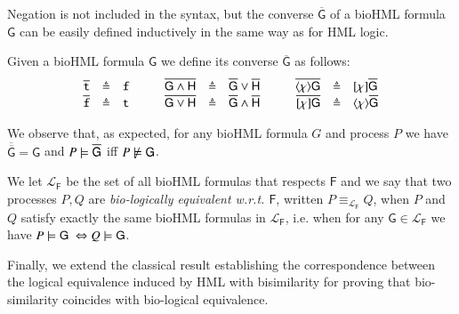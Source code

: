 Negation is not included in the syntax, but the converse $\overline{\mathsf{G}}$ of a bioHML formula $\mathsf{G}$ can be easily defined inductively in the same way as for HML logic.

\begin{definition}[Converse]
Given a bioHML formula $\mathsf{G}$ we define its converse $\overline{\mathsf{G}}$ as follows:
\[
\begin{array}{rcl@{\hspace{1cm}}rcl@{\hspace{1cm}}rcl}
\overline{\tt t} & \defeq & {\tt f} &
\overline{\mathsf{G} \wedge \mathsf{H}} & \defeq & \overline{\mathsf{G}} \vee \overline{\mathsf{H}} &
\overline{\langle \chi \rangle \mathsf{G}} & \defeq & [\chi]\overline{\mathsf{G}}
\\
\overline{\tt f} & \defeq & {\tt t} &
\overline{\mathsf{G} \vee \mathsf{H}} & \defeq & \overline{\mathsf{G}} \wedge \overline{\mathsf{H}} &
\overline{[\chi]\mathsf{G}} & \defeq & \langle \chi \rangle\overline{\mathsf{G}}
\end{array}
\]
\end{definition}

We observe that, as expected, for any bioHML formula $G$ and process $P$ we have $\overline{\overline{\mathsf{G}}} = \mathsf{G}$ and  $P \models \overline{\mathsf{G}}$ iff  $P\not\models \mathsf{G}$.
\begin{definition}
We let $\mathcal{L}_{\mathsf{F}}$ be the set of all bioHML formulas that respects $\mathsf{F}$ and 
we say that two processes $P,Q$ are \emph{bio-logically equivalent w.r.t. $\mathsf{F}$}, written $P \equiv_{\mathcal{L}_{\mathsf{F}}}Q$, when $P$ and $Q$ satisfy exactly the same bioHML formulas in $\mathcal{L}_{\mathsf{F}}$, i.e. when for any $\mathsf{G}\in \mathcal{L}_{\mathsf{F}}$ we have $P \entails \mathsf{G}\ \Leftrightarrow Q \entails \mathsf{G}$.
\end{definition}

Finally, we extend the classical result establishing the correspondence between the logical equivalence induced by HML with bisimilarity for proving that bio-similarity coincides with bio-logical equivalence.



